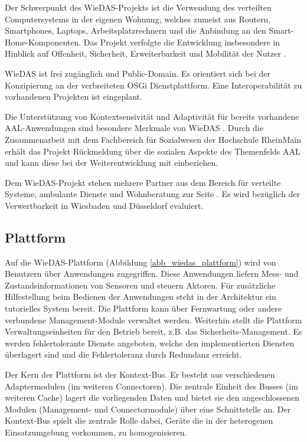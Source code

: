 Der Schwerpunkt des WieDAS-Projekts ist die Verwendung des verteilten Computersystems in der eigenen Wohnung,
welches zumeist aus Routern, Smartphones, Laptops, Arbeitsplatzrechnern und die Anbindung an den Smart-Home-Komponenten.
Das Projekt verfolgte die Entwicklung insbesondere in Hinblick auf Offenheit, Sicherheit, Erweiterbarkeit
und Mobilität der Nutzer \cite{wiedas}.

WieDAS ist frei zugänglich und Public-Domain.
Es orientiert sich bei der Konzipierung an der verbreiteten OSGi Dienstplattform.
Eine Interoperabilität zu vorhandenen Projekten ist eingeplant.

Die Unterstützung von Kontextsensivität und Adaptivität für bereits vorhandene AAL-Anwendungen sind besondere
Merkmale von WieDAS \cite{wiedas}.
Durch die Zusammenarbeit mit dem Fachbereich für Sozialwesen der Hochschule RheinMain erhält das Projekt
Rückmeldung über die sozialen Aspekte des Themenfelds AAL und kann diese bei der Weiterentwicklung mit
einbeziehen.

Dem WieDAS-Projekt stehen mehrere Partner aus dem Bereich für verteilte Systeme, ambulante Dienste und
Wohnberatung zur Seite \cite[Partner]{wiedas}.
Es wird bezüglich der Verwertbarkeit in Wiesbaden und Düsseldorf evaluiert.

\subsection{Plattform}
\label{gru_wiedas_plattform}


Auf die WieDAS-Plattform (Abbildung \ref{abb_wiedas_plattform}) wird von Benutzern über Anwendungen zugegriffen.
Diese Anwendungen liefern Mess- und Zustandsinformationen von Sensoren und steuern Aktoren.
Für zusätzliche Hilfestellung beim Bedienen der Anwendungen steht in der Architektur ein
tutorielles System bereit.
Die Plattform kann über Fernwartung oder andere verbundene Management-Module verwaltet werden.
Weiterhin stellt die Plattform Verwaltungseinheiten für den Betrieb bereit, z.B. das Sicherheits-Management.
Es werden fehlertolerante Dienste angeboten, welche den implementierten Diensten überlagert sind und die
Fehlertoleranz durch Redundanz erreicht.

Der Kern der Plattform ist der Kontext-Bus.
Er besteht aus verschiedenen Adaptermodulen (im weiteren Connectoren).
Die zentrale Einheit des Busses (im weiteren Cache) lagert die vorliegenden Daten und bietet sie
den angeschlossenen Modulen (Management- und Connectormodule) über eine Schnittstelle an.
Der Kontext-Bus spielt die zentrale Rolle dabei, Geräte die in der heterogenen Einsatzumgebung vorkommen, zu
homogenisieren.

